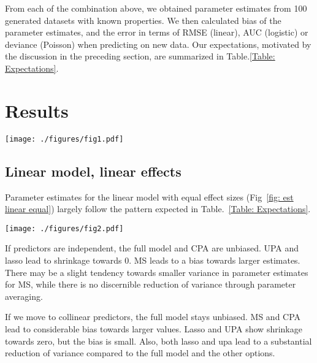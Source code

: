 \documentclass[5p]{elsarticle}
\begin{document}
From each of the combination above, we obtained parameter estimates from 100 generated datasets with known properties. We then calculated bias of the parameter estimates, and the error in terms of RMSE (linear), AUC (logistic) or deviance (Poisson) when predicting on new data. Our expectations, motivated by the discussion in the preceding section, are summarized in Table.\ref{Table: Expectations}.



\section{Results}

\begin{figure*}\label{fig: est linear equal}
\texttt{[image: ./figures/fig1.pdf]}
\caption{Bias of parameter estimates for linear regressions with independent (left) and collinear predictors.}
\end{figure*}



\subsection{Linear model, linear effects} 

Parameter estimates for the linear model with equal effect sizes (Fig~\ref{fig: est linear equal}) largely follow the pattern expected in Table.~\ref{Table: Expectations}.

\begin{figure*}\label{fig: err linear equal}
\texttt{[image: ./figures/fig2.pdf]}
\caption{Predictive error of parameter estimates for linear regressions with independent (left) and collinear predictors.}
\end{figure*}

If predictors are independent, the full model and CPA are unbiased. UPA and lasso lead to shrinkage towards 0. MS leads to a bias towards larger estimates. There may be a slight tendency towards smaller variance in parameter estimates for MS, while there is no discernible reduction of variance through parameter averaging. 

If we move to collinear predictors, the full model stays unbiased. MS and CPA lead to considerable bias towards larger values. Lasso and UPA show shrinkage towards zero, but the bias is small. Also, both lasso and upa lead to a substantial reduction of variance compared to the full model and the other options. 
\end{document}
